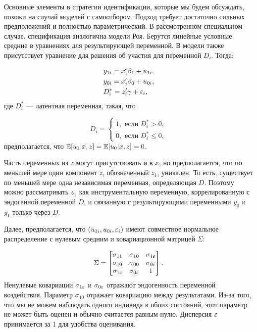 Основные элементы в стратегии идентификации, которые мы будем обсуждать, похожи на случай моделей с самоотбором. Подход требует достаточно сильных предположений и полностью параметрический. В рассмотренном специальном случае, спецификация аналогична модели Роя. Берутся линейные условные средние в уравнениях для результирующей переменной. В модели также присутствует уравнение для решения об участия для переменной $D_i$. Тогда:

\begin{align}
\label{eq25.31}
& y_{1i} = x'_i \beta_1 + u_{1i}, \\
& y_{0i} = x'_i \beta_0 + u_{0i}, \nonumber \\
& D^*_i = z'_i \gamma + \varepsilon_i, \nonumber
\end{align}
где $D_i^*$ --- латентная переменная, такая, что

\begin{equation}
\label{eq25.32}
D_i=\begin{cases}
1, \text{ если }D_i^*>0,\\
0, \text{ если }D_i^* \le 0,
\end{cases}
\end{equation}
предполагается, что $\mathbb{E} [u_1 | x, z] = \mathbb{E}[u_0 | x, z ] = 0$. 

Часть переменных из $z$ могут присутствовать и в $x$, но предполагается, что по меньшей мере один компонент $z$, обозначенный $z_1$, уникален. То есть, существует по меньшей мере одна независимая переменная, определяющая $D$. Поэтому можно рассматривать $z_1$ как инструментальную переменную, коррелированную с эндогенной переменной $D$, и связанную с результирующими переменными $y_0$ и $y_1$ только через $D$. 

Далее, предполагается, что $(u_{1i}, u_{0i}, \varepsilon_i)$ имеют совместное нормальное распределение с нулевым средним и ковариационной матрицей $\Sigma$:

\begin{equation}
\label{eq25.33}
\Sigma = \begin{bmatrix}
\sigma_{11} & \sigma_{10} & \sigma_{1 \varepsilon} \\
\sigma_{10} & \sigma_{00} & \sigma_{0 \varepsilon} \\
\sigma_{1 \varepsilon} & \sigma_{0 \varepsilon} & 1 \\
\end{bmatrix}.
\end{equation}
Ненулевые ковариации $\sigma_{1 \varepsilon}$ и $\sigma_{0 \varepsilon}$ отражают эндогенность переменной воздействия. Параметр $\sigma_{10}$ отражает ковариацию между результатами. Из-за того, что мы не можем наблюдать одного индивида в обоих состояний, этот параметр не может быть оценен и обычно считается равным нулю. Дисперсия $\varepsilon$ принимается за 1 для удобства оценивания. 


